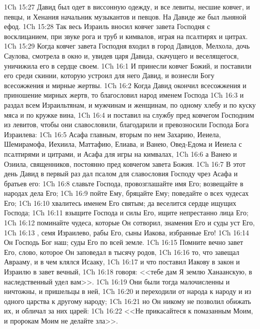 \vs 1Ch 15:27 Давид был одет в виссонную одежду,  и все левиты, несшие ковчег, и певцы, и Хенания начальник музыкантов и певцов. На Давиде же был  льняной ефод.
\vs 1Ch 15:28 Так весь Израиль вносил ковчег завета Господня с восклицанием, при звуке рога и труб и кимвалов, играя на псалтирях и цитрах.
\rsbpar\vs 1Ch 15:29 Когда ковчег завета Господня входил в город Давидов, Мелхола, дочь Саулова, смотрела в окно и, увидев царя Давида, скачущего и веселящегося, уничижила его в сердце своем.
\vs 1Ch 16:1 И принесли ковчег Божий, и поставили его среди скинии, которую устроил для него Давид, и вознесли Богу всесожжения и мирные жертвы.
\rsbpar\vs 1Ch 16:2 Когда Давид окончил всесожжения и приношение мирных жертв, то благословил народ именем Господа
\vs 1Ch 16:3 и раздал всем Израильтянам, и мужчинам и женщинам, по одному хлебу и по куску мяса и по кружке вина,
\rsbpar\vs 1Ch 16:4 и поставил на службу пред ковчегом Господним  из левитов, чтобы они славословили, благодарили и превозносили Господа Бога Израилева:
\vs 1Ch 16:5 Асафа главным, вторым по нем Захарию, Иеиела, Шемирамофа, Иехиила, Маттафию, Елиава, и Ванею, Овед-Едома и Иеиела с псалтирями и цитрами, и Асафа для игры на кимвалах,
\vs 1Ch 16:6 а Ванею и Озиила, священников,  постоянно  пред ковчегом завета Божия.
\rsbpar\vs 1Ch 16:7 В этот день Давид в первый раз дал псалом для славословия Господу чрез Асафа и братьев его:
\vs 1Ch 16:8 славьте Господа, провозглашайте имя Его; возвещайте в народах дела Его;
\vs 1Ch 16:9 пойте Ему, бряцайте Ему; поведайте о всех чудесах Его;
\vs 1Ch 16:10 хвалитесь именем Его святым; да веселится сердце ищущих Господа;
\vs 1Ch 16:11 взыщите Господа и силы Его, ищите непрестанно лица Его;
\vs 1Ch 16:12 поминайте чудеса, которые Он сотворил, знамения Его и суды уст Его,
\vs 1Ch 16:13 , семя Израилево, рабы Его, сыны Иакова, избранные Его!
\vs 1Ch 16:14 Он Господь Бог наш; суды Его по всей земле.
\vs 1Ch 16:15 Помните вечно завет Его, слово, которое Он заповедал в тысячу родов,
\vs 1Ch 16:16 то, что завещал Аврааму, и в чем клялся Исааку,
\vs 1Ch 16:17 и что поставил Иакову в закон и Израилю в завет вечный,
\vs 1Ch 16:18 говоря: <<тебе дам Я землю Ханаанскую, в наследственный удел вам>>.
\vs 1Ch 16:19 Они были тогда малочисленны и ничтожны, и пришельцы в ней,
\vs 1Ch 16:20 и переходили от народа к народу и из одного царства к другому народу;
\vs 1Ch 16:21 но Он никому не позволил обижать их, и обличал за них царей:
\vs 1Ch 16:22 <<Не прикасайтеся к помазанным Моим, и пророкам Моим не делайте зла>>.
